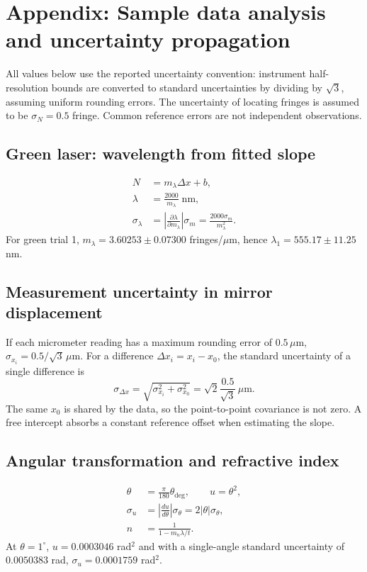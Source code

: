 \section*{Appendix: Sample data analysis and uncertainty propagation}
\noindent All values below use the reported uncertainty convention: instrument
half-resolution bounds are converted to standard uncertainties by dividing by $\sqrt{3}$,
assuming uniform rounding errors. The uncertainty of locating fringes is assumed to be
$\sigma_N=0.5$ fringe. Common reference errors are not independent observations.

\subsection*{Green laser: wavelength from fitted slope}
\begin{align*}
N &= m_\lambda\Delta x+b,\\
\lambda &=\frac{2000}{m_\lambda}\;\mathrm{nm},\\
\sigma_\lambda &=\left|\frac{\partial\lambda}{\partial m_\lambda}\right|\sigma_m
=\frac{2000\sigma_m}{m_\lambda^2}.
\end{align*}
For green trial 1, $m_\lambda=3.60253\pm0.07300$ fringes/$\mu$m, hence
$\lambda_1=555.17\pm11.25$ nm.

\subsection*{Measurement uncertainty in mirror displacement}
If each micrometer reading has a maximum rounding error of $0.5\,\mu$m,
$\sigma_{x_i}=0.5/\sqrt{3}\,\mu$m. For a difference
$\Delta x_i=x_i-x_0$, the standard uncertainty of a single difference is
\[
\sigma_{\Delta x}=\sqrt{\sigma_{x_i}^2+\sigma_{x_0}^2}
=\sqrt{2}\frac{0.5}{\sqrt3}\,\mu\mathrm m.
\]
The same $x_0$ is shared by the data, so the point-to-point covariance is not zero.
A free intercept absorbs a constant reference offset when estimating the slope.

\subsection*{Angular transformation and refractive index}
\begin{align*}
\theta &= \frac{\pi}{180}\theta_{\mathrm{deg}},\qquad u=\theta^2,\\
\sigma_u&=\left|\frac{du}{d\theta}\right|\sigma_\theta=2|\theta|\sigma_\theta,\\
n&=\frac{1}{1-m_n\lambda/t}.
\end{align*}
At $\theta=1^\circ$, $u=0.0003046$ rad$^2$ and with a single-angle
standard uncertainty of $0.0050383$ rad, $\sigma_u=0.0001759$ rad$^2$.

